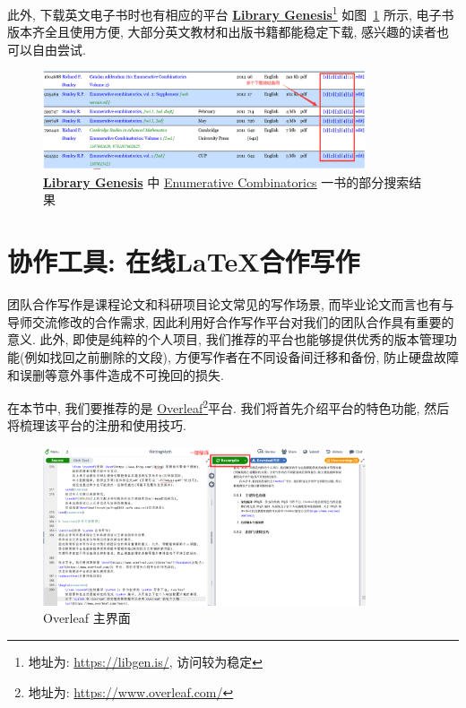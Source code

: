 \documentclass{formatBook}
\begin{document}
此外, 下载英文电子书时也有相应的平台 \textbf{\href{https://libgen.is/}{Library Genesis}}\footnote{地址为: \url{https://libgen.is/}, 访问较为稳定} 如图~\ref{fig:libgen} 所示, 电子书版本齐全且使用方便, 大部分英文教材和出版书籍都能稳定下载, 感兴趣的读者也可以自由尝试.
\begin{figure}[H]
    \centering
    \includegraphics[width=0.85\textwidth]{figure/ec.png}
    \caption{\textbf{\href{https://libgen.is/}{Library Genesis}} 中 \href{https://libgen.is/search.php?&req=Enumerative+Combinatorics&phrase=1&view=simple&column=def&sort=year&sortmode=DESC}{Enumerative Combinatorics} 一书的部分搜索结果}
    \label{fig:libgen}
\end{figure}

\section{协作工具: 在线\LaTeX 合作写作}
团队合作写作是课程论文和科研项目论文常见的写作场景, 而毕业论文而言也有与导师交流修改的合作需求, 因此利用好合作写作平台对我们的团队合作具有重要的意义. 此外, 即使是纯粹的个人项目, 我们推荐的平台也能够提供优秀的版本管理功能(例如找回之前删除的文段), 方便写作者在不同设备间迁移和备份, 防止硬盘故障和误删等意外事件造成不可挽回的损失.

在本节中, 我们要推荐的是 \href{https://www.overleaf.com/}{Overleaf}\footnote{地址为: \url{https://www.overleaf.com/}}平台. 我们将首先介绍平台的特色功能, 然后将梳理该平台的注册和使用技巧.

\begin{figure}[H]
    \centering
    \includegraphics[width=0.85\textwidth]{figure/overleafMain.png}
    \caption{Overleaf 主界面}
    \label{fig:overleafMain}
\end{figure}
\end{document}
